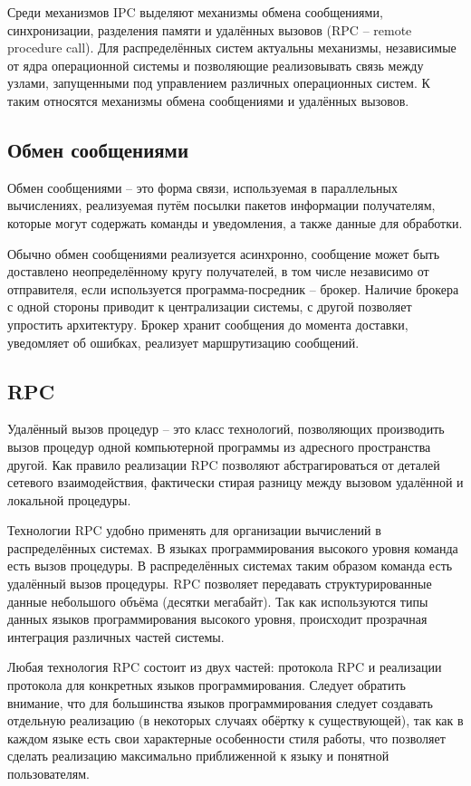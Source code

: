 Среди механизмов IPC выделяют механизмы обмена сообщениями, синхронизации,
разделения памяти и удалённых вызовов (RPC -- remote procedure call).
Для распределённых систем актуальны механизмы, независимые от ядра операционной
системы и позволяющие реализовывать связь между узлами, запущенными
под управлением различных операционных систем. К таким относятся механизмы
обмена сообщениями и удалённых вызовов.

\subsection{Обмен сообщениями}
Обмен сообщениями -- это форма связи, используемая в параллельных вычислениях,
реализуемая путём посылки пакетов информации получателям, которые могут
содержать команды и уведомления, а также данные для обработки.

Обычно обмен сообщениями реализуется асинхронно, сообщение может быть доставлено
неопределённому кругу получателей, в том числе независимо от отправителя,
если используется программа-посредник -- брокер. Наличие брокера с одной стороны
приводит к централизации системы, с другой позволяет упростить архитектуру.
Брокер хранит сообщения до момента доставки, уведомляет об ошибках,
реализует маршрутизацию сообщений.

\subsection{RPC}
Удалённый вызов процедур -- это класс технологий, позволяющих производить
вызов процедур одной компьютерной программы из адресного пространства другой.
Как правило реализации RPC позволяют абстрагироваться от деталей сетевого
взаимодействия, фактически стирая разницу между вызовом удалённой и локальной
процедуры.

Технологии RPC удобно применять для организации вычислений в распределённых
системах. В языках программирования высокого уровня команда есть вызов процедуры.
В распределённых системах таким образом команда есть удалённый вызов процедуры.
RPC позволяет передавать структурированные данные небольшого объёма (десятки
мегабайт). Так как используются типы данных языков программирования высокого
уровня, происходит прозрачная интеграция различных частей системы.

Любая технология RPC состоит из двух частей: протокола RPC и
реализации протокола для конкретных языков программирования. Следует обратить
внимание, что для большинства языков программирования следует создавать
отдельную реализацию (в некоторых случаях обёртку к существующей),
так как в каждом языке есть свои характерные особенности стиля работы,
что позволяет сделать реализацию максимально приближенной к языку и понятной
пользователям.

